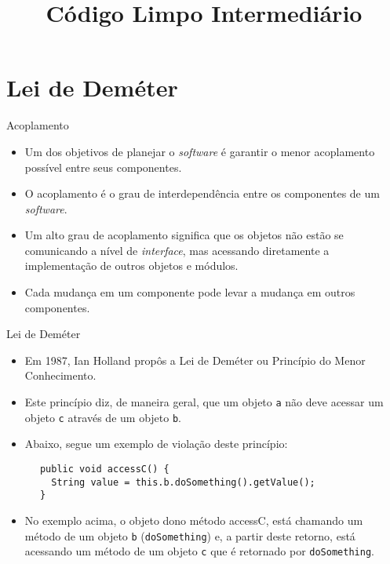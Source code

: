 \documentclass[11pt]{beamer}
\title{Código Limpo Intermediário}
\author{}
\date{}
\begin{document}
  \begin{frame}[plain]
    \titlepage
  \end{frame}

	\section{Lei de Deméter}

  \begin{frame}{Acoplamento}
    \begin{itemize}
      \item Um dos objetivos de planejar o \textit{software} é garantir o menor acoplamento possível entre seus componentes.
      \item O acoplamento é o grau de interdependência entre os componentes de um \textit{software}.
      \item Um alto grau de acoplamento significa que os objetos não estão se comunicando a nível de \textit{interface}, mas acessando diretamente a implementação de outros objetos e módulos.
      \item Cada mudança em um componente pode levar a mudança em outros componentes.
    \end{itemize}
  \end{frame}

  \begin{frame}[fragile]{Lei de Deméter}
    \begin{itemize}
      \item Em 1987, Ian Holland propôs a Lei de Deméter ou Princípio do Menor Conhecimento.
      \item Este princípio diz, de maneira geral, que um objeto \verb|a| não deve acessar um objeto \verb|c| através de um objeto \verb|b|.
      \item Abaixo, segue um exemplo de violação deste princípio:
    \end{itemize}
    \begin{lstlisting}
      public void accessC() {
        String value = this.b.doSomething().getValue();
      }
    \end{lstlisting}
    \begin{itemize}
      \item No exemplo acima, o objeto dono método accessC, está chamando um método de um objeto \verb|b| (\verb|doSomething|) e, a partir deste retorno, está acessando um método de um objeto \verb|c| que é retornado por \verb|doSomething|.
    \end{itemize}
  \end{frame}
 
\end{document}
